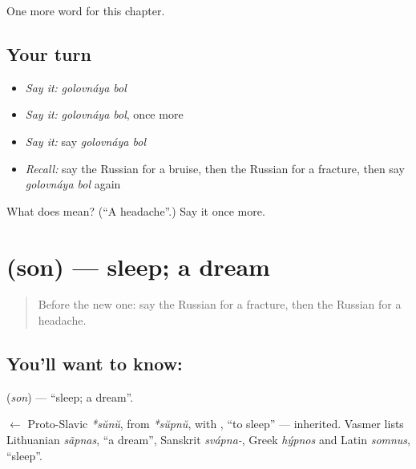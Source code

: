 \begin{grammarlens}[title={What you've built}]
One more word for this chapter.
\end{grammarlens}

\subsection*{Your turn}
\begin{itemize}
\raggedright
  \item \emph{Say it:} \emph{golovnáya bol}
  \item \emph{Say it:} \emph{golovnáya bol}, once more
  \item \emph{Say it:} say \emph{golovnáya bol}
  \item \emph{Recall:} say the Russian for a bruise, then the Russian for a fracture, then say \emph{golovnáya bol} again
\end{itemize}

\begin{tcolorbox}[breakable,colback=teal!4,colframe=teal!35!black,title={Before you move on}]
What does   mean? (\textquotedblleft{}A headache\textquotedblright{}.) Say it once more.
\end{tcolorbox}
\section[\texorpdfstring{\ru{сон} (son)}{сон (son)}]{ (son) — sleep; a dream}

\label{lesson:RU-C180-son}



\begin{quote}
Before the new one: say the Russian for a fracture, then the Russian for a headache.
\end{quote}

\subsection*{You'll want to know: }
\textbf{} (\emph{son}) — \textquotedblleft{}sleep; a dream\textquotedblright{}.

\begin{cousinweb}
\textbf{} $\leftarrow$ Proto-Slavic \emph{*sŭnŭ}, from \emph{*sŭpnŭ}, with \emph{}, \textquotedblleft{}to sleep\textquotedblright{} — inherited. Vasmer lists Lithuanian \emph{sãpnas}, \textquotedblleft{}a dream\textquotedblright{}, Sanskrit \emph{svápna-}, Greek \emph{hýpnos} and Latin \emph{somnus}, \textquotedblleft{}sleep\textquotedblright{}.
\end{cousinweb}

